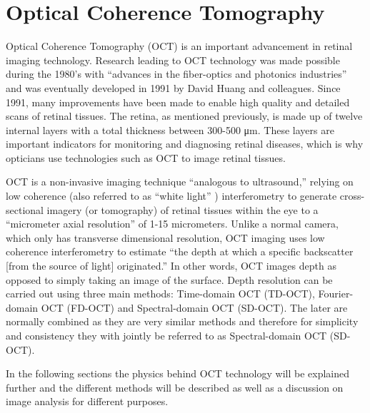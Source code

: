 
\chapter{Optical Coherence Tomography}

\label{optical_coherence_tomography}

Optical Coherence Tomography (OCT) is an important advancement in retinal imaging technology.  Research leading to OCT technology was made possible during the 1980’s with “advances in the fiber-optics and photonics industries” \cite{} and was eventually developed in 1991 by David Huang and colleagues. \cite{} \cite{}  Since 1991, many improvements have been made to enable high quality and detailed scans of retinal tissues.  The retina, as mentioned previously, is made up of twelve internal layers with a total thickness between 300-500 μm. \cite{} These layers are important indicators for monitoring and diagnosing retinal diseases, which is why opticians use technologies such as OCT to image retinal tissues. 

OCT is a non-invasive imaging technique “analogous to ultrasound,” \cite{} relying on low coherence (also referred to as “white light” \cite{} ) interferometry to generate cross-sectional imagery (or tomography) of retinal tissues within the eye to a “micrometer axial resolution” \cite{} of 1-15 micrometers. \cite{} \cite{} Unlike a normal camera, which only has transverse dimensional resolution, OCT imaging uses low coherence interferometry to estimate “the depth at which a specific backscatter [from the source of light] originated.” \cite{}  In other words, OCT images depth as opposed to simply taking an image of the surface.  Depth resolution can be carried out using three main methods: Time-domain OCT (TD-OCT), Fourier-domain OCT (FD-OCT) and Spectral-domain OCT (SD-OCT).  The later are normally combined as they are very similar methods and therefore for simplicity and consistency they with jointly be referred to as Spectral-domain OCT (SD-OCT). 

In the following sections the physics behind OCT technology will be explained further and the different methods will be described as well as a discussion on image analysis for different purposes.

